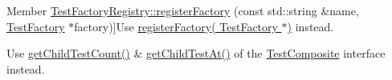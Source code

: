 \begin{DoxyRefList}
\hypertarget{deprecated__deprecated000007}{}%
Member \hyperlink{class_test_factory_registry_aff8d8215ec83fbb77d46706264e2f161}{Test\+Factory\+Registry\+:\+:register\+Factory} (const std\+::string \&name, \hyperlink{class_test_factory}{Test\+Factory} $\ast$factory)]Use \hyperlink{class_test_factory_registry_a632c38375727ca735e2c1897bd625b99}{register\+Factory( Test\+Factory $\ast$)} instead.  
\item[\label{deprecated__deprecated000008}%
\hypertarget{deprecated__deprecated000008}{}%
Member \hyperlink{class_test_suite_ad2bd3e20523bb357b7a4608a7978ea49}{Test\+Suite\+:\+:get\+Tests} () const ]Use \hyperlink{class_test_suite_aeaabfd3afef12412cd390b90128a7d87}{get\+Child\+Test\+Count()} \& \hyperlink{class_test_aad295af3b440fdec4bd95ddd422466b8}{get\+Child\+Test\+At()} of the \hyperlink{class_test_composite}{Test\+Composite} interface instead. 
\end{DoxyRefList}